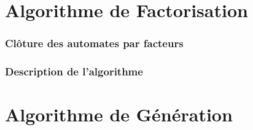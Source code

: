\documentclass[11pt]{beamer}
\begin{document}
	\section{Algorithme de Factorisation}
	
	\begin{frame}
		\frametitle{Clôture des automates par facteurs}
	\end{frame}

	\begin{frame}
		\frametitle{Description de l'algorithme}
	\end{frame}

	\section{Algorithme de Génération}
	
\end{document}
